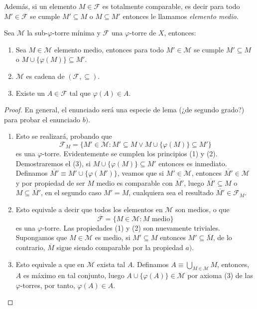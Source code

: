 \documentclass[11pt,oneside,a4paper]{book}
\begin{document}
Además, si un elemento $M\in\mathcal{F}$ es totalmente comparable, es decir para todo $M'\in\mathcal{F}$ se cumple $M'\subseteq M$ o $M\subseteq M'$ entonces le llamamos \textit{elemento medio}.
\begin{lem}\label{lem:self-contained-phi-tower}
Sea $\mathcal{M}$ la sub-$\varphi$-torre mínima y $\mathcal{F}$ una $\varphi$-torre de $X$, entonces:
\begin{enumerate}[$a)$]
\item Sea $M\in\mathcal{M}$ elemento medio, entonces para todo $M'\in\mathcal{M}$ se cumple $M'\subseteq M$ o $M\cup\{\varphi(M)\}\subseteq M'$.
\item $\mathcal{M}$ es cadena de $(\mathcal{F},\subseteq)$.
\item Existe un $A\in\mathcal{F}$ tal que $\varphi(A)\in A$.
\end{enumerate}
\end{lem}
\begin{proof}
En general, el enunciado será una especie de lema (¿de segundo grado?) para probar el enunciado $b)$.
\begin{enumerate}[$a)$]
\item Esto se realizará, probando que
$$\mathcal{F}_M=\{M'\in\mathcal{M}:M'\subseteq M\vee M\cup\{\varphi(M)\}\subseteq M'\}$$
es una $\varphi$-torre. Evidentemente se cumplen los principios (1) y (2). Demostraremos el (3), si $M\cup\{\varphi(M)\}\subseteq M'$ entonces es inmediato. Definamos $\overline{M'}\equiv M'\cup\{\varphi(M')\}$, veamos que si $M'\in\mathcal{M}$, entonces $\overline{M'}\in\mathcal{M}$ y por propiedad de ser $M$ medio es comparable con $\overline{M'}$, luego $\overline{M'}\subseteq M$ o $M\subseteq\overline{M'}$, en el segundo caso $M'=M$, cualquiera sea el resultado $\overline{M'}\in\mathcal{F}_M$.
\item Esto equivale a decir que todos los elementos en $\mathcal{M}$ son medios, o que
$$\overline{\mathcal{F}}=\{M\in\mathcal{M}:M\text{ medio}\}$$
es una $\varphi$-torre. Las propiedades (1) y (2) son nuevamente triviales. Supongamos que $M\in\mathcal{M}$ es medio, si $M'\subseteq M$ entonces $M'\subseteq\overline{M}$, de lo contrario, $\overline{M}$ sigue siendo comparable por la propiedad $a)$.
\item Esto equivale a que en $\mathcal{M}$ exista tal $A$. Definamos $A\equiv\bigcup_{M\in\mathcal{M}}M$, entonces, $A$ es máximo en tal conjunto, luego $A\cup\{\varphi(A)\}\in\mathcal{M}$ por axioma (3) de las $\varphi$-torres, por tanto, $\varphi(A)\in A$.
\end{enumerate}
\end{proof}
\end{document}
